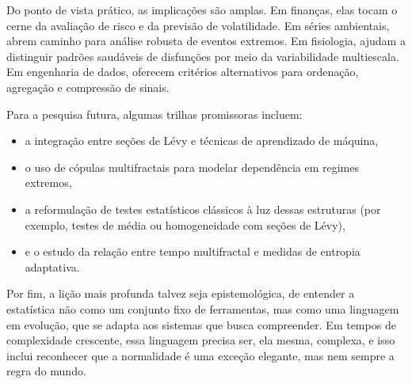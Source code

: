 \documentclass[
  letterpaper,
  DIV=11,
  numbers=noendperiod]{scrartcl}
\providecommand{\tightlist}{%
  \setlength{\itemsep}{0pt}\setlength{\parskip}{0pt}}\usepackage{longtable,booktabs,array}
\begin{document}
Do ponto de vista prático, as implicações são amplas. Em finanças, elas
tocam o cerne da avaliação de risco e da previsão de volatilidade. Em
séries ambientais, abrem caminho para análise robusta de eventos
extremos. Em fisiologia, ajudam a distinguir padrões saudáveis de
disfunções por meio da variabilidade multiescala. Em engenharia de
dados, oferecem critérios alternativos para ordenação, agregação e
compressão de sinais.

Para a pesquisa futura, algumas trilhas promissoras incluem:

\begin{itemize}
\tightlist
\item
  a integração entre seções de Lévy e técnicas de aprendizado de
  máquina,
\item
  o uso de cópulas multifractais para modelar dependência em regimes
  extremos,
\item
  a reformulação de testes estatísticos clássicos à luz dessas
  estruturas (por exemplo, testes de média ou homogeneidade com seções
  de Lévy),
\item
  e o estudo da relação entre tempo multifractal e medidas de entropia
  adaptativa.
\end{itemize}

Por fim, a lição mais profunda talvez seja epistemológica, de entender a
estatística não como um conjunto fixo de ferramentas, mas como uma
linguagem em evolução, que se adapta aos sistemas que busca compreender.
Em tempos de complexidade crescente, essa linguagem precisa ser, ela
mesma, complexa, e isso inclui reconhecer que a normalidade é uma
exceção elegante, mas nem sempre a regra do mundo.
\end{document}
